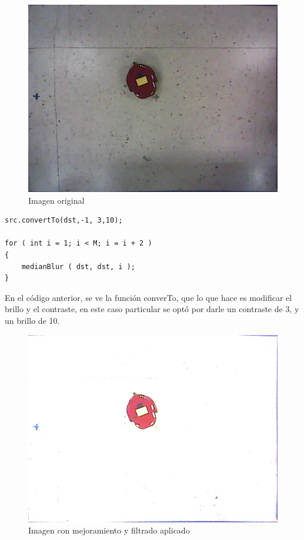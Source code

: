 \documentclass[spanish,10pt,letterpaper, twocolumn]{article}
\begin{document}
\begin{figure}[ht]
	\centering
	\includegraphics[scale=0.2]{foto150.jpg}
	\caption{Imagen original}
	\label{vision:fig3}
\end{figure}

\lstset{language=C++}
\begin{lstlisting}[frame=single]
src.convertTo(dst,-1, 3,10);

for ( int i = 1; i < M; i = i + 2 )
{
	medianBlur ( dst, dst, i );
}
\end{lstlisting}

En el c\'odigo anterior, se ve la funci\'on converTo, que lo que hace es modificar el brillo y el contraste, en este caso particular se opt\'o por darle un contraste de 3, y un brillo de 10.

\begin{figure}[ht]
	\centering
	\includegraphics[scale=0.2]{median150.jpg}
	\caption{Imagen con mejoramiento y filtrado aplicado}
	\label{vision:fig4}
\end{figure}
\end{document}

